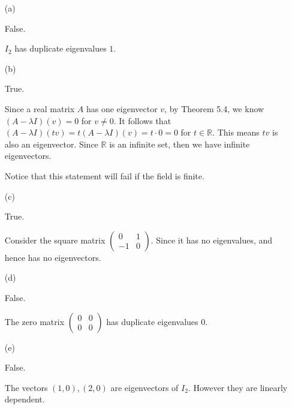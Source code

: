 \begin{Exercise}
\begin{enumerate}[(a)]
\item[(a)]
\begin{answer}
False.
\end{answer}
\begin{solution}
$I_2$ has duplicate eigenvalues $1$.
\end{solution}

\item[(b)]
\begin{answer}
True.
\end{answer}
\begin{solution}
Since a real matrix $A$ has one eigenvector $v$, by Theorem 5.4, we know $(A-\lambda I)(v) = 0$ for $v\neq 0$. It follows that $(A-\lambda I)(t v) = t(A-\lambda I)(v) = t\cdot 0 = 0$ for $t\in\mathbb{R}$. This means $t v$ is also an eigenvector. Since $\mathbb{R}$ is an infinite set, then we have infinite eigenvectors. 

Notice that this statement will fail if the field is finite.
\end{solution}

\item[(c)]
\begin{answer}
True.
\end{answer}
\begin{solution}
Consider the square matrix $\begin{pmatrix}
0 & 1 \\
-1 & 0
\end{pmatrix}$. Since it has no eigenvalues, and hence has no eigenvectors.
\end{solution}

\item[(d)]
\begin{answer}
False.
\end{answer}
\begin{solution}
The zero matrix $\begin{pmatrix}
0 & 0 \\
0 & 0
\end{pmatrix}$ has duplicate eigenvalues $0$.
\end{solution}

\item[(e)]
\begin{answer}
False.
\end{answer}
\begin{solution}
The vectors $(1,0),(2,0)$ are eigenvectors of $I_2$. However they are linearly dependent.
\end{solution}


\end{enumerate}
\end{Exercise}
